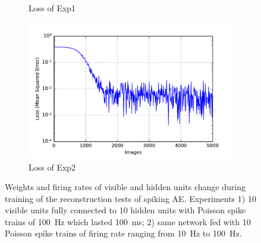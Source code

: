 \begin{figure}
\begin{subfigure}[t]{0.4\textwidth}
		\caption{Loss of Exp1}
	\end{subfigure}
	\begin{subfigure}[t]{0.4\textwidth}
		\includegraphics[width=\textwidth]{pics_sdlm/05_exp_SAE_teach_long/exp2_mse_nons.pdf}
		\caption{Loss of Exp2}
	\end{subfigure}
	\caption{Weights and firing rates of visible and hidden units change during training of the reconstruction tests of spiking AE. 
		Experiments 1) 10 visible units fully connected to 10 hidden units with Poisson spike trains of 100~Hz which lasted 100~ms; 2) same network fed with 10 Poisson spike trains of firing rate ranging from 10~Hz to 100~Hz.}
\end{figure}

